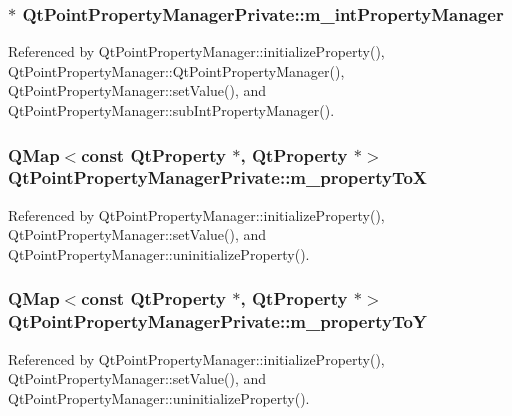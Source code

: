 \subsubsection[{m\+\_\+int\+Property\+Manager}]{$\ast$ Qt\+Point\+Property\+Manager\+Private\+::m\+\_\+int\+Property\+Manager}\label{classQtPointPropertyManagerPrivate_a68936ed0170e2d316c06b1e0bd2f8388}


Referenced by Qt\+Point\+Property\+Manager\+::initialize\+Property(), Qt\+Point\+Property\+Manager\+::\+Qt\+Point\+Property\+Manager(), Qt\+Point\+Property\+Manager\+::set\+Value(), and Qt\+Point\+Property\+Manager\+::sub\+Int\+Property\+Manager().

\subsubsection[{m\+\_\+property\+ToX}]{\setlength{\rightskip}{0pt plus 5cm}Q\+Map$<$const {\bf Qt\+Property} $\ast$, {\bf Qt\+Property} $\ast$$>$ Qt\+Point\+Property\+Manager\+Private\+::m\+\_\+property\+ToX}\label{classQtPointPropertyManagerPrivate_a5a2d9c121cab4e4a3b97c17406672dda}


Referenced by Qt\+Point\+Property\+Manager\+::initialize\+Property(), Qt\+Point\+Property\+Manager\+::set\+Value(), and Qt\+Point\+Property\+Manager\+::uninitialize\+Property().

\subsubsection[{m\+\_\+property\+ToY}]{\setlength{\rightskip}{0pt plus 5cm}Q\+Map$<$const {\bf Qt\+Property} $\ast$, {\bf Qt\+Property} $\ast$$>$ Qt\+Point\+Property\+Manager\+Private\+::m\+\_\+property\+ToY}\label{classQtPointPropertyManagerPrivate_ab58daf166748ea77b57bb899d0754b5f}


Referenced by Qt\+Point\+Property\+Manager\+::initialize\+Property(), Qt\+Point\+Property\+Manager\+::set\+Value(), and Qt\+Point\+Property\+Manager\+::uninitialize\+Property().

